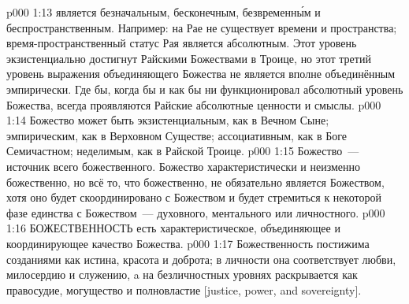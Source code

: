 \vs p000 1:13 \pc {} является безначальным, бесконечным, безвременн\'ым и беспространственным. Например: на Рае не существует времени и пространства; время\hyp{}пространственный статус Рая является абсолютным. Этот уровень экзистенциально достигнут Райскими Божествами в Троице, но этот третий уровень выражения объединяющего Божества не является вполне объединённым эмпирически. Где бы, когда бы и как бы ни функционировал абсолютный уровень Божества, всегда проявляются Райские абсолютные ценности и смыслы.
\vs p000 1:14 \pc Божество может быть экзистенциальным, как в Вечном Сыне; эмпирическим, как в Верховном Существе; ассоциативным, как в Боге Семичастном; неделимым, как в Райской Троице.
\vs p000 1:15 Божество~--- источник всего божественного. Божество характеристически и неизменно божественно, но всё то, что божественно, не обязательно является Божеством, хотя оно будет скоординировано с Божеством и будет стремиться к некоторой фазе единства с Божеством~--- духовного, ментального или личностного.
\vs p000 1:16 \pc БОЖЕСТВЕННОСТЬ есть характеристическое, объединяющее и координирующее качество Божества.
\vs p000 1:17 Божественность постижима созданиями как истина, красота и доброта; в личности она соответствует любви, милосердию и служению, a на безличностных уровнях раскрывается как правосудие, могущество и полновластие [justice, power, and sovereignty].
